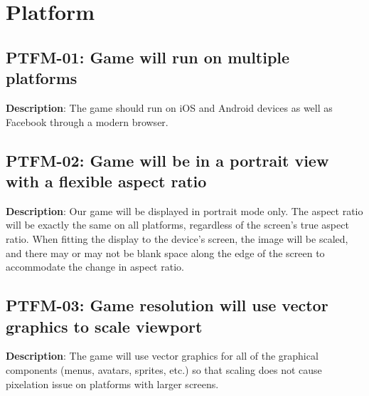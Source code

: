 \section{Platform}
\subsection{PTFM-01: Game will run on multiple platforms}
\textbf{Description}: The game should run on iOS and Android devices as well
as Facebook through a modern browser.
\subsection{PTFM-02: Game will be in a portrait view with a flexible aspect ratio}
\textbf{Description}: Our game will be displayed in portrait mode only. The
aspect ratio will be exactly the same on all platforms, regardless
of the screen\textquoteright{}s true aspect ratio. When fitting the
display to the device\textquoteright{}s screen, the image will be
scaled, and there may or may not be blank space along the edge of
the screen to accommodate the change in aspect ratio.
\subsection{PTFM-03: Game resolution will use vector graphics to scale viewport}
\textbf{Description}: The game will use vector graphics for all of
the graphical components (menus, avatars, sprites, etc.) so that scaling
does not cause pixelation issue on platforms with larger screens. 
